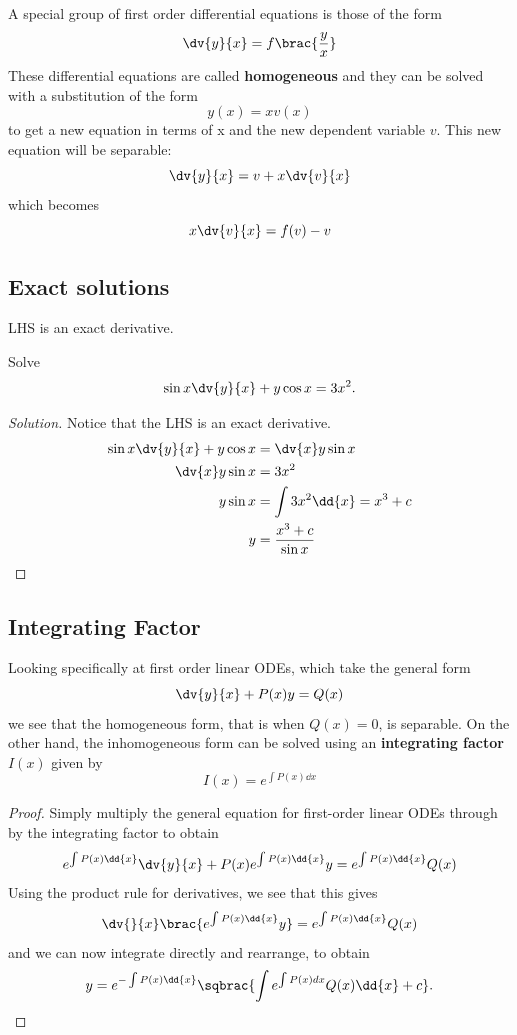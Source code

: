A special group of first order differential equations is those of the form
\[ \dv{y}{x} = f\brac{\frac{y}{x}} \]
These differential equations are called \textbf{homogeneous} and they can be solved with a substitution
of the form
\[ y(x) = xv(x) \]
to get a new equation in terms of x and the new dependent variable $v$. This new equation will be
separable:
\[ \dv{y}{x} = v + x\dv{v}{x} \]
which becomes
\[ x\dv{v}{x} = f(v) - v \]

\subsection{Exact solutions}
LHS is an exact derivative.
\begin{exercise}
Solve 
\[ \sin x\dv{y}{x}+y\cos x=3x^2. \]
\end{exercise}
\begin{proof}[Solution]
Notice that the LHS is an exact derivative.
\begin{align*}
\sin x\dv{y}{x}+y\cos x &= \dv{x}y\sin x \\
\dv{x}y\sin x &= 3x^2 \\
y \sin x &= \int 3x^2\dd{x} = x^3+c \\
y &= \frac{x^3+c}{\sin x}
\end{align*}
\end{proof}

\subsection{Integrating Factor}
Looking specifically at first order linear ODEs, which take the general form
\[ \dv{y}{x} + P(x)y = Q(x) \]
we see that the homogeneous form, that is when $Q(x)=0$, is separable. On the other hand, the inhomogeneous form can be solved using an \textbf{integrating factor} $I(x)$ given by
\[ I(x) = e^{\int P(x) \dd{x}} \]
\begin{proof}
Simply multiply the general equation for first-order linear ODEs through by the integrating factor to obtain
\[ e^{\int P(x) \dd{x}} \dv{y}{x} + P(x) e^{\int P(x) \dd{x}}y = e^{\int P(x) \dd{x}} Q(x) \]
Using the product rule for derivatives, we see that this gives
\[ \dv{}{x}\brac{e^{\int P(x) \dd{x}}y} = e^{\int P(x) \dd{x}} Q(x) \]
and we can now integrate directly and rearrange, to obtain
\[ y = e^{-\int P(x) \dd{x}} \sqbrac{\int e^{\int P(x)dx} Q(x) \dd{x} + c}. \]
\end{proof}

